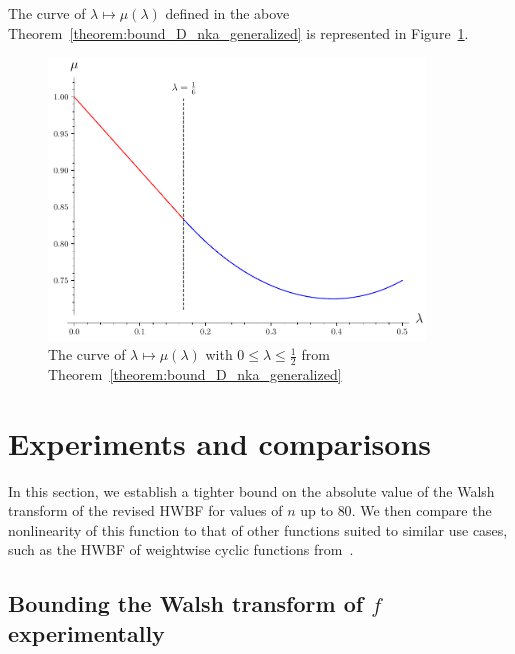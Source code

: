 \documentclass[11pt]{llncs}
\begin{document}
The curve of $\lambda\mapsto\mu(\lambda)$ defined in the above Theorem~\ref{theorem:bound_D_nka_generalized} is represented in Figure~\ref{fig:curve_exponents_lambda_mu}.

\begin{figure}
	\centering
	\includegraphics[width=10cm]{curve_exponents_lambda_mu.pdf}
	\caption{The curve of $\lambda\mapsto\mu(\lambda)$ with $0\leq\lambda\leq\frac 12$ from Theorem~\ref{theorem:bound_D_nka_generalized}}
	\label{fig:curve_exponents_lambda_mu}
\end{figure}



\section{Experiments and comparisons}

In this section, we establish a tighter bound on the absolute value of the Walsh transform of the revised HWBF for values of $n$ up to $80$. 
We then compare the nonlinearity of this function to that of other functions suited to similar use cases, such as the HWBF of weightwise cyclic functions from~\cite{DAM:MeaOza24}.

\subsection{Bounding the Walsh transform of $f$ experimentally}\label{sec:expwt}

\end{document}
